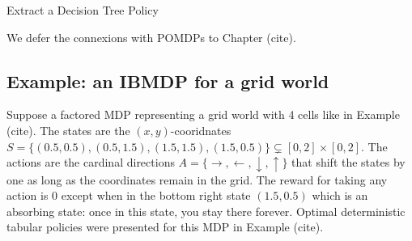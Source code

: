 \begin{algorithm}[t]
    
    
    
    \caption{Extract a Decision Tree Policy}\label{alg_extract_tree}
\end{algorithm}

We defer the connexions with POMDPs to Chapter (cite).

\subsection{Example: an IBMDP for a grid world}
Suppose a factored MDP representing a grid world with 4 cells like in Example (cite). 
The states are the $(x,y)$-cooridnates $S = \{(0.5, 0.5), (0.5, 1.5), (1.5, 1.5), (1.5, 0.5)\}\subsetneq [0, 2] \times [0, 2]$.
The actions are the cardinal directions $A = \{\rightarrow, \leftarrow, \downarrow, \uparrow\}$ that shift the states by one as long as the coordinates remain in the grid.
The reward for taking any action is 0 except when in the bottom right state $(1.5, 0.5)$ which is an absorbing state: once in this state, you stay there forever. 
Optimal deterministic tabular policies were presented for this MDP in Example (cite).

